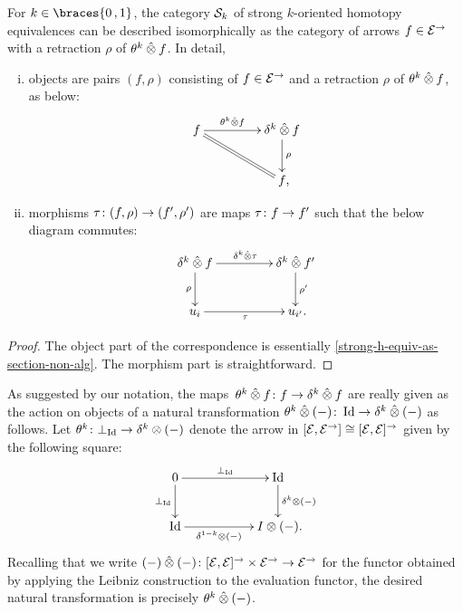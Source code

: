 \documentclass[reqno,10pt,a4paper,oneside,draft]{amsart}
\begin{document}
{{\begin{lemma} \label{strong-h-equiv-as-section}
For $k \in \braces{0\,, 1}$, the category $\cal{S}_k$ of strong $k$-oriented homotopy equivalences can be described isomorphically as the category of arrows $f \in \catE^{\to}$ with a retraction $\rho$ of $\thetak \hatotimes f$.
In detail,
\begin{enumerate}[(i)]
\item objects are pairs $(f, \rho)$ consisting of $f \in \catE^\to$ and a retraction $\rho$ of $\thetak \hatotimes f$, as below:
\[
\xymatrix@C+2em{
  f
  \ar[r]^-{\thetak \hatotimes f}
  \ar@{=}[dr]
&
  \kcyl \hatotimes f \ar[d]^{\rho}
\\&
  f
\rlap{,}}
\]
\item morphisms $\tau \co (f, \rho) \to (f', \rho')$ are maps $\tau \co f \to f'$ such that the below diagram commutes:
\[
\xymatrix@C+2em{
  \kcyl \hatotimes f
  \ar[d]_-{\rho}
  \ar[r]^{\kcyl \hatotimes \tau}
&
 \kcyl \hatotimes f'
  \ar[d]^-{\rho'}
\\
  u_i
  \ar[r]_{\tau}
&
  u_{i'}
\rlap{.}}
\]
\end{enumerate}
\end{lemma}

\begin{proof}
The object part of the correspondence is essentially \cref{strong-h-equiv-as-section-non-alg}.
The morphism part is straightforward.
\end{proof}

\begin{remark} \label{theta}
As suggested by our notation, the maps~$\thetak \hatotimes f \co f \to \kcyl \hatotimes f$ are really given as the action on objects of a natural transformation $\thetak \hatotimes (-) \co \Id \to \delta^k \hatotimes (-)$ as follows.
Let $\theta^k \co \bot_{\Id} \to \delta^k \otimes (-)$ denote the arrow in $[\cal{E}, \cal{E}^\to] \iso [\cal{E}, \cal{E}]^\to$ given by the following square:
\[
\xymatrix@C+3em{
  0
  \ar[r]^-{\bot_{\Id}}
  \ar[d]_-{\bot_{\Id}}
&
  \Id
  \ar[d]^-{\delta^k \otimes (-)}
\\
  \Id
  \ar[r]_-{\delta^{1-k} \otimes (-)}
&
  \interval \otimes (-)
\rlap{.}}
\]
Recalling that we write $(-) \hatotimes (-) \co [\cal{E}, \cal{E}]^\to \times \cal{E}^\to \to \cal{E}^\to$ for
the functor obtained by applying the Leibniz construction to the evaluation functor, the desired natural transformation 
is precisely $\theta^k \hatotimes (-)$.
\end{remark}

}}
\end{document}
